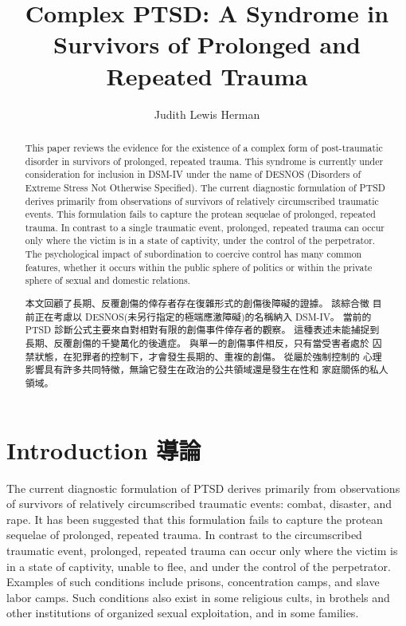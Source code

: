 \documentclass[12pt]{article}
\title{Complex PTSD: A Syndrome in Survivors of Prolonged and Repeated Trauma}
\author{Judith Lewis Herman}
\date{}
\begin{document}
\maketitle

\begin{abstract}
    This paper reviews the evidence for the existence of a complex form of
    post-traumatic disorder in survivors of prolonged, repeated trauma. This
    syndrome is currently under consideration for inclusion in DSM-IV under the
    name of DESNOS (Disorders of Extreme Stress Not Otherwise Specified). The
    current diagnostic formulation of PTSD derives primarily from observations
    of survivors of relatively circumscribed traumatic events. This formulation
    fails to capture the protean sequelae of prolonged, repeated trauma. In
    contrast to a single traumatic event, prolonged, repeated trauma can occur
    only where the victim is in a state of captivity, under the control of the
    perpetrator. The psychological impact of subordination to coercive control
    has many common features, whether it occurs within the public sphere of
    politics or within the private sphere of sexual and domestic relations.

    本文回顧了長期、反覆創傷的倖存者存在復雜形式的創傷後障礙的證據。 該綜合徵
    目前正在考慮以 DESNOS(未另行指定的極端應激障礙)的名稱納入 DSM-IV。 當前的
    PTSD 診斷公式主要來自對相對有限的創傷事件倖存者的觀察。 這種表述未能捕捉到
    長期、反覆創傷的千變萬化的後遺症。 與單一的創傷事件相反，只有當受害者處於
    囚禁狀態，在犯罪者的控制下，才會發生長期的、重複的創傷。 從屬於強制控制的
    心理影響具有許多共同特徵，無論它發生在政治的公共領域還是發生在性和
    家庭關係的私人領域。
\end{abstract}

\tableofcontents
\newpage

\section{Introduction 導論}
    The current diagnostic formulation of PTSD derives primarily from
    observations of survivors of relatively circumscribed traumatic events:
    combat, disaster, and rape. It has been suggested that this formulation
    fails to capture the protean sequelae of prolonged, repeated trauma. In
    contrast to the circumscribed traumatic event, prolonged, repeated trauma
    can occur only where the victim is in a state of captivity, unable to flee,
    and under the control of the perpetrator. Examples of such conditions
    include prisons, concentration camps, and slave labor camps. Such
    conditions also exist in some religious cults, in brothels and other
    institutions of organized sexual exploitation, and in some families.
\end{document}
